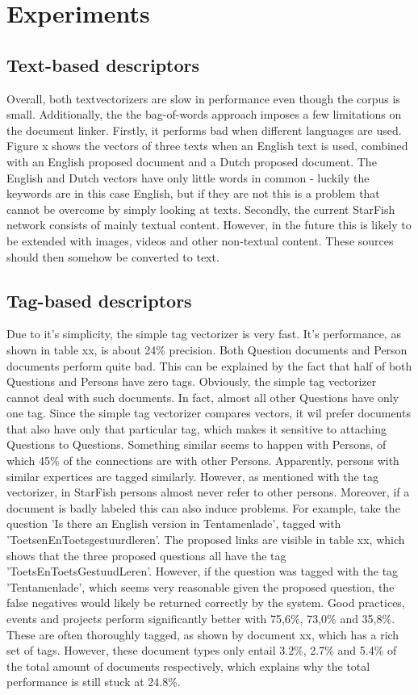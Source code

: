 \section{Experiments}
\subsection{Text-based descriptors}
Overall, both textvectorizers are slow in performance even though the corpus is small. Additionally, the the bag-of-words approach imposes a few limitations on the document linker. Firstly, it performs bad when different languages are used. Figure x shows the vectors of three texts when an English text is used, combined with an English proposed document and a Dutch proposed document. The English and Dutch vectors have only little words in common - luckily the keywords are in this case English, but if they are not this is a problem that cannot be overcome by simply looking at texts. Secondly, the current StarFish network consists of mainly textual content. However, in the future this is likely to be extended with images, videos and other non-textual content. These sources should then somehow be converted to text.

\subsection{Tag-based descriptors}

Due to it's simplicity, the simple tag vectorizer is very fast. It's performance, as shown in table xx, is about 24\% precision. Both Question documents and Person documents perform quite bad. This can be explained by the fact that half of both Questions and Persons have zero tags. Obviously, the simple tag vectorizer cannot deal with such documents. In fact, almost all other Questions have only one tag. Since the simple tag vectorizer compares vectors, it wil prefer documents that also have only that particular tag, which makes it sensitive to attaching Questions to Questions. Something similar seems to happen with Persons, of which 45\% of the connections are with other Persons. Apparently, persons with similar expertices are tagged similarly. However, as mentioned with the tag vectorizer, in StarFish persons almost never refer to other persons. Moreover, if a document is badly labeled this can also induce problems. For example, take the question 'Is there an English version in Tentamenlade', tagged with 'ToetsenEnToetsgestuurdleren'. The proposed links are visible in table xx, which shows that  the three proposed questions all have the tag 'ToetsEnToetsGestuudLeren'. However, if the question was tagged with the tag 'Tentamenlade', which seems very reasonable given the proposed question, the false negatives would likely be returned correctly by the system. Good practices, events and projects perform significantly better with 75,6\%, 73,0\% and 35,8\%. These are often thoroughly tagged, as shown by document xx, which has a rich set of tags. However, these document types only entail 3.2\%, 2.7\% and 5.4\% of the total amount of documents respectively, which explains why the total performance is still stuck at 24.8\%. 

